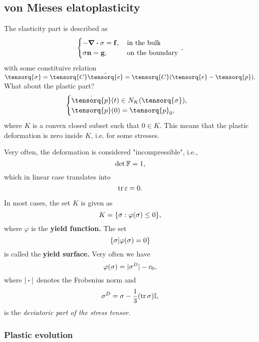 \documentclass[reqno, a4paper]{article}
\begin{document}
\subsection{von Mieses elatoplasticity}
\label{sec:von_mieses}

The elasticity part is described as
\[
	\begin{cases}
		- \divergence{\tensorq{\sigma}} = \vb{f}, &  \, \text{in the bulk} \,\\
		\tensorq{\sigma} \vb{n} = \vb{g}, & \, \text{on the boundary} \, \\
	\end{cases},
\]
with some constituive relation $\tensorq{\sigma} = \tensorq{C}\tilde{\tensorq{e}} = \tensorq{C}\qty(\tensorq{e}-\tensorq{p}).$
What about the plastic part? 
\[
	\begin{cases} 
		\dot{\tensorq{p}}(t) \in N_K\qty(\tensorq{\sigma}), & \\
		\tensorq{p}(0)=\tensorq{p}_0, &
	\end{cases}
\]
where $K$ is a convex closed subset such that $0 \in K$. This means that the plastic deformation is zero inside $K$, i.e. for some stresses. 

\begin{remark}
    Very often, the deformation is considered "incompressible", i.e.,
    \[
	    \det \mathbb{F} = 1,
    \]
    which in linear case translates into
    \[
	    \tr \mathbb{\varepsilon} = 0.
    \]
\end{remark}

In most cases, the set $K$ is given as
\[
	K = \{ \mathbb{\sigma}:\varphi\qty(\mathbb{\sigma}) \leq 0\},
\]
where $\varphi$ is the \textbf{yield function.} The set
\[
	\{\mathbb{\sigma}| \varphi\qty(\mathbb{\sigma}) = 0\}
\]
is called the \textbf{yield surface.} Very often we have
\[
	\varphi\qty(\mathbb{\sigma}) = |\mathbb{\sigma}^D|-c_0,
\]
where $| \vdot |$ denotes the Frobenius norm and
\[
	\mathbb{\sigma}^D = \mathbb{\sigma} - \frac{1}{3}\qty(\tr \mathbb{\sigma})\mathbb{I},
\]
is the \textit{deviatoric part of the stress tensor}.

\subsubsection{Plastic evolution}
\label{sec:plastic_evolution}
\end{document}
